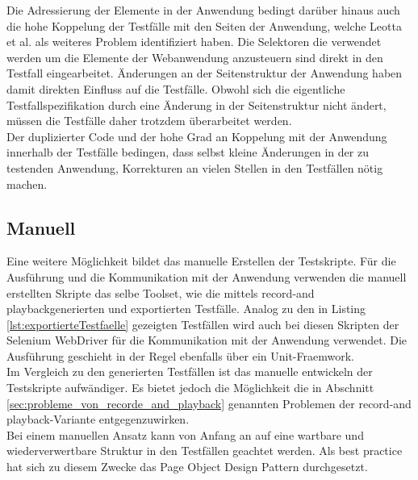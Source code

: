 Die Adressierung der Elemente in der Anwendung bedingt darüber hinaus auch die hohe Koppelung der Testfälle mit den Seiten der Anwendung, welche Leotta et al. \cite{leotta_repairing_2013} als weiteres Problem identifiziert haben. Die Selektoren die verwendet werden um die Elemente der Webanwendung anzusteuern sind direkt in den Testfall eingearbeitet. Änderungen an der Seitenstruktur der Anwendung haben damit direkten Einfluss auf die Testfälle.
Obwohl sich die eigentliche Testfallspezifikation durch eine Änderung in der Seitenstruktur nicht ändert, müssen die Testfälle daher trotzdem überarbeitet werden.\\
Der duplizierter Code und der hohe Grad an Koppelung mit der Anwendung innerhalb der Testfälle bedingen, dass selbst kleine Änderungen in der zu testenden Anwendung, Korrekturen an vielen Stellen in den Testfällen nötig machen.

\subsection{Manuell}
\label{sec:manuell}
Eine weitere Möglichkeit bildet das manuelle Erstellen der Testskripte. Für die Ausführung und die Kommunikation mit der Anwendung verwenden die manuell erstellten Skripte das selbe Toolset, wie die mittels \grq record-and playback\grq generierten und exportierten Testfälle. Analog zu den in Listing \ref{lst:exportierteTestfaelle} gezeigten Testfällen wird auch bei diesen Skripten der Selenium WebDriver für die Kommunikation mit der Anwendung verwendet. Die Ausführung geschieht in der Regel ebenfalls über ein Unit-Fraemwork.\\
Im Vergleich zu den generierten Testfällen ist das manuelle entwickeln der Testskripte aufwändiger.
Es bietet jedoch die Möglichkeit die in Abschnitt \ref{sec:probleme_von_recorde_and_playback} genannten Problemen der \grq record-and playback\grq -Variante entgegenzuwirken.\\
Bei einem manuellen Ansatz kann von Anfang an auf eine wartbare und wiederverwertbare Struktur in den Testfällen geachtet werden.
Als best practice hat sich zu diesem Zwecke das Page Object Design Pattern durchgesetzt.

